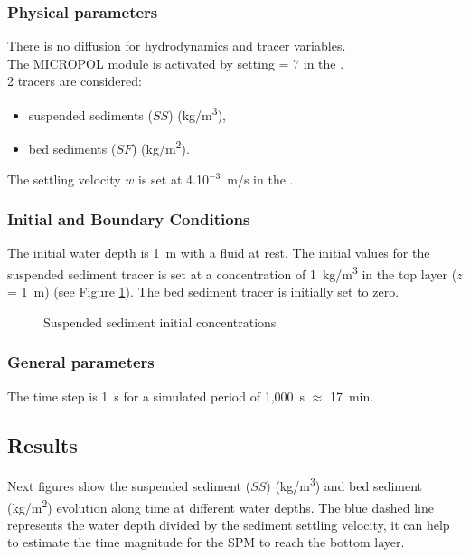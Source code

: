 \subsubsection{Physical parameters}
There is no diffusion for hydrodynamics and tracer variables.\\
The MICROPOL module is activated by setting  = 7
in the  .\\

2 tracers are considered:
\begin{itemize}
\item suspended sediments ($SS$) (kg/m\textsuperscript{3}),

\item bed sediments ($SF$) (kg/m\textsuperscript{2}).
\end{itemize}

The settling velocity $w$ is set at 4.10$^{-3}$~m/s in the \waqtel {}.

\subsubsection{Initial and Boundary Conditions}
The initial water depth is 1~m with a fluid at rest.
The initial values for the suspended sediment tracer is set at a concentration of 1~kg/m\textsuperscript{3} in the top layer ($z$ = 1~m) (see Figure \ref{fig:waq3d_micropol:ss_i}). The bed sediment tracer is initially set to zero.

\begin{figure}[H]
 \centering
\caption{Suspended sediment initial concentrations}
 \label{fig:waq3d_micropol:ss_i}
\end{figure}
\subsubsection{General parameters}

The time step is 1~s for a simulated period of 1,000~s $\approx$ 17~min.

\subsection{Results}

Next figures show the suspended sediment ($SS$) (kg/m\textsuperscript{3}) and bed sediment (kg/m\textsuperscript{2}) evolution along time at different water depths. The blue dashed line represents the water depth divided by the sediment settling velocity, it can help to estimate the time magnitude for the SPM to reach the bottom layer.

